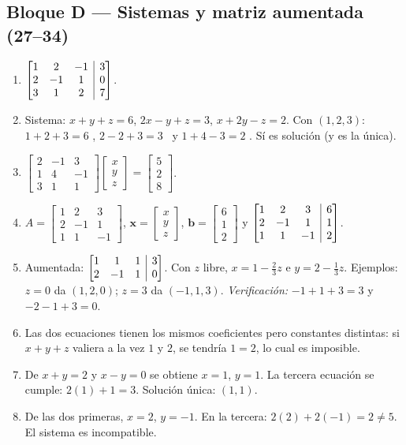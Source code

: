 \documentclass[12pt, letterpaper]{article}
\makeatletter
\newcommand{\mwmat}[1]{\ensuremath{\begin{bmatrix}#1\end{bmatrix}}}
\newcommand{\mwaug}[2]{\ensuremath{\left[\begin{array}{@{}#1@{}}#2\end{array}\right]}}
\makeatother
\begin{document}
\subsection*{Bloque D — Sistemas y matriz aumentada (27--34)}
\begin{enumerate}[label=\textbf{\arabic*.}, start=27, leftmargin=*]
  \item $\mwaug{ccc|c}{1&2&-1&3\\2&-1&1&0\\3&1&2&7}$.
  \item Sistema: $x+y+z=6$, $2x-y+z=3$, $x+2y-z=2$. Con $(1,2,3)$:
        $1+2+3=6$ \checkmark, $2-2+3=3$ \checkmark\ y $1+4-3=2$ \checkmark.
        Sí es solución (y es la única).
  \item
        $\mwmat{2&-1&3\\1&4&-1\\3&1&1}\mwmat{x\\y\\z}=\mwmat{5\\2\\8}$.
  \item $A=\mwmat{1&2&3\\2&-1&1\\1&1&-1}$,
        $\mathbf{x}=\mwmat{x\\y\\z}$, $\mathbf{b}=\mwmat{6\\1\\2}$ y
        $\mwaug{ccc|c}{1&2&3&6\\2&-1&1&1\\1&1&-1&2}$.
  \item Aumentada: $\mwaug{ccc|c}{1&1&1&3\\2&-1&1&0}$. Con $z$ libre,
        $x=1-\tfrac23z$ e $y=2-\tfrac13z$. Ejemplos: $z=0$ da
        $(1,2,0)$; $z=3$ da $(-1,1,3)$.
        \emph{Verificación:} $-1+1+3=3$ y $-2-1+3=0$. \checkmark
  \item Las dos ecuaciones tienen los mismos coeficientes pero constantes
        distintas: si $x+y+z$ valiera a la vez $1$ y $2$, se tendría
        $1=2$, lo cual es imposible.
  \item De $x+y=2$ y $x-y=0$ se obtiene $x=1$, $y=1$. La tercera ecuación
        se cumple: $2(1)+1=3$. Solución única: $(1,1)$.
  \item De las dos primeras, $x=2$, $y=-1$. En la tercera:
        $2(2)+2(-1)=2\neq5$. El sistema es incompatible.
\end{enumerate}
\end{document}
